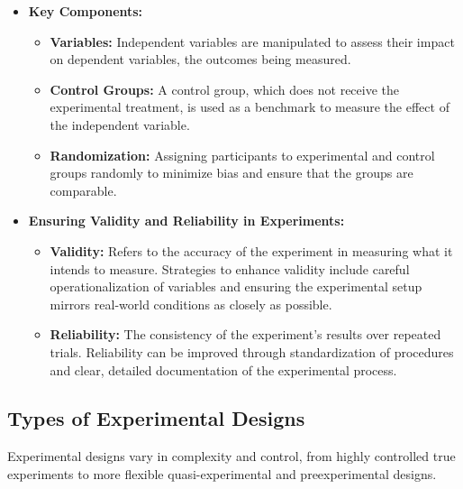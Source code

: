 \documentclass[
]{book}
\providecommand{\tightlist}{%
  \setlength{\itemsep}{0pt}\setlength{\parskip}{0pt}}
\begin{document}
\begin{itemize}
\tightlist
\item
  \textbf{Key Components:}

  \begin{itemize}
  \tightlist
  \item
    \textbf{Variables:} Independent variables are manipulated to assess their impact on dependent variables, the outcomes being measured.
  \item
    \textbf{Control Groups:} A control group, which does not receive the experimental treatment, is used as a benchmark to measure the effect of the independent variable.
  \item
    \textbf{Randomization:} Assigning participants to experimental and control groups randomly to minimize bias and ensure that the groups are comparable.
  \end{itemize}
\item
  \textbf{Ensuring Validity and Reliability in Experiments:}

  \begin{itemize}
  \tightlist
  \item
    \textbf{Validity:} Refers to the accuracy of the experiment in measuring what it intends to measure. Strategies to enhance validity include careful operationalization of variables and ensuring the experimental setup mirrors real-world conditions as closely as possible.
  \item
    \textbf{Reliability:} The consistency of the experiment's results over repeated trials. Reliability can be improved through standardization of procedures and clear, detailed documentation of the experimental process.
  \end{itemize}
\end{itemize}

\hypertarget{types-of-experimental-designs}{%
\subsection*{Types of Experimental Designs}\label{types-of-experimental-designs}}

Experimental designs vary in complexity and control, from highly controlled true experiments to more flexible quasi-experimental and preexperimental designs.
\end{document}
